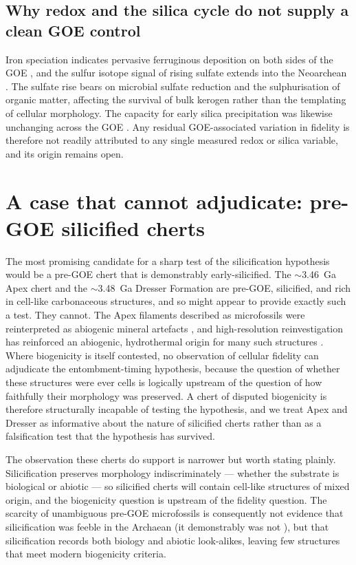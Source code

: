 \documentclass[11pt]{article}
\begin{document}
\subsection{Why redox and the silica cycle do not supply a clean GOE control}

Iron speciation indicates pervasive ferruginous deposition on both sides of the GOE
\citep{Canfield1998,Poulton2011}, and the sulfur isotope signal of rising sulfate extends into the
Neoarchean \citep{Reinhard2009,Philippot2018}. The sulfate rise bears on microbial sulfate
reduction and the sulphurisation of organic matter, affecting the survival of bulk kerogen rather
than the templating of cellular morphology. The capacity for early silica precipitation was likewise
unchanging across the GOE \citep{Siever1992,Perry2007}. Any residual GOE-associated variation in
fidelity is therefore not readily attributed to any single measured redox or silica variable, and
its origin remains open.

\section{A case that cannot adjudicate: pre-GOE silicified cherts}\label{sec:falsify}

The most promising candidate for a sharp test of the silicification hypothesis would be a pre-GOE
chert that is demonstrably early-silicified. The $\sim$3.46~Ga Apex chert and the $\sim$3.48~Ga
Dresser Formation are pre-GOE, silicified, and rich in cell-like carbonaceous structures, and so
might appear to provide exactly such a test. They cannot. The Apex filaments described as
microfossils \citep{Schopf1993} were reinterpreted as abiogenic mineral artefacts
\citep{Brasier2002}, and high-resolution reinvestigation has reinforced an abiogenic, hydrothermal
origin for many such structures \citep{Wacey2014}. Where biogenicity is itself contested, no
observation of cellular fidelity can adjudicate the entombment-timing hypothesis, because the
question of whether these structures were ever cells is logically upstream of the question of how
faithfully their morphology was preserved. A chert of disputed biogenicity is therefore structurally
incapable of testing the hypothesis, and we treat Apex and Dresser as informative about the nature
of silicified cherts rather than as a falsification test that the hypothesis has survived.

The observation these cherts do support is narrower but worth stating plainly. Silicification
preserves morphology indiscriminately --- whether the substrate is biological or abiotic --- so
silicified cherts will contain cell-like structures of mixed origin, and the biogenicity question is
upstream of the fidelity question. The scarcity of unambiguous pre-GOE microfossils is consequently
not evidence that silicification was feeble in the Archaean (it demonstrably was not
\citep{Siever1992,Perry2007}), but that silicification records both biology and abiotic look-alikes,
leaving few structures that meet modern biogenicity criteria.
\end{document}

